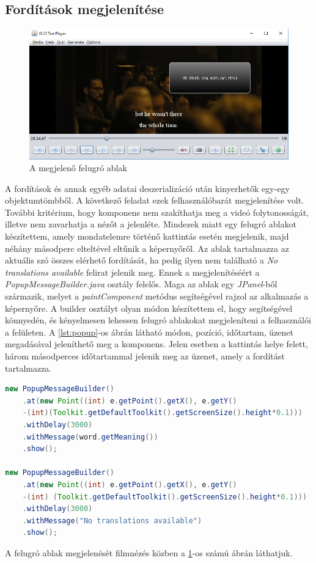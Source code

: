 \subsection{Fordítások megjelenítése}
\begin{figure}
  \includegraphics[width=\linewidth]{images/popup.png}
  \caption{A megjelenő felugró ablak}
  \label{fig:popup}
\end{figure}

A fordítások és annak egyéb adatai deszerializáció után kinyerhetők egy-egy objektumtömbből. A következő feladat ezek felhasználóbarát megjelenítése volt. További kritérium, hogy komponens nem szakíthatja meg a videó folytonosságát, illetve nem zavarhatja a nézőt a jelenléte. Mindezek miatt egy felugró ablakot készítettem, amely mondatelemre történő kattintás esetén megjelenik, majd néhány másodperc elteltével eltűnik a képernyőről. Az ablak tartalmazza az aktuális szó összes elérhető fordítását, ha pedig ilyen nem található a \textit{No translations available} felirat jelenik meg. Ennek a megjelenítéséért a \textit{PopupMessageBuilder.java} osztály felelős. Maga az ablak egy \textit{JPanel}-ből származik, melyet a \textit{paintComponent} metódus segítségével rajzol az alkalmazás a képernyőre. A builder osztályt olyan módon készítettem el, hogy segítségével könnyedén, és kényelmesen lehessen felugró ablakokat megjeleníteni a felhasználói a felületen. A \ref{lst:popup}-os ábrán látható módon, pozíció, időtartam, üzenet megadásával jeleníthető meg a komponens. Jelen esetben a kattintás helye felett, három másodperces időtartammal jelenik meg az üzenet, amely a fordítást tartalmazza.

\begin{lstlisting}[caption=A \textit{PopupMessageBuilder} használata, label={lst:popup}, language=java]
new PopupMessageBuilder()
    .at(new Point((int) e.getPoint().getX(), e.getY()
    -(int)(Toolkit.getDefaultToolkit().getScreenSize().height*0.1)))
    .withDelay(3000)
    .withMessage(word.getMeaning())
    .show();

new PopupMessageBuilder()
    .at(new Point((int) e.getPoint().getX(), e.getY()
    -(int) (Toolkit.getDefaultToolkit().getScreenSize().height*0.1)))
    .withDelay(3000)
    .withMessage("No translations available")
    .show();
\end{lstlisting}

A felugró ablak megjelenését filmnézés közben a \ref{fig:popup}-os számú ábrán láthatjuk.